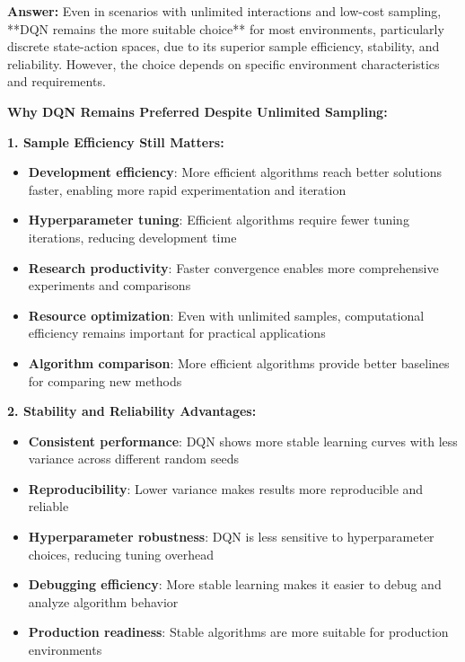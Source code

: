 \documentclass[12pt]{article}
\begin{document}
{{{\textbf{Answer:} Even in scenarios with unlimited interactions and low-cost sampling, **DQN remains the more suitable choice** for most environments, particularly discrete state-action spaces, due to its superior sample efficiency, stability, and reliability. However, the choice depends on specific environment characteristics and requirements.

\textbf{Why DQN Remains Preferred Despite Unlimited Sampling:}

\textbf{1. Sample Efficiency Still Matters:}
\begin{itemize}
    \item \textbf{Development efficiency}: More efficient algorithms reach better solutions faster, enabling more rapid experimentation and iteration
    \item \textbf{Hyperparameter tuning}: Efficient algorithms require fewer tuning iterations, reducing development time
    \item \textbf{Research productivity}: Faster convergence enables more comprehensive experiments and comparisons
    \item \textbf{Resource optimization}: Even with unlimited samples, computational efficiency remains important for practical applications
    \item \textbf{Algorithm comparison}: More efficient algorithms provide better baselines for comparing new methods
\end{itemize}

\textbf{2. Stability and Reliability Advantages:}
\begin{itemize}
    \item \textbf{Consistent performance}: DQN shows more stable learning curves with less variance across different random seeds
    \item \textbf{Reproducibility}: Lower variance makes results more reproducible and reliable
    \item \textbf{Hyperparameter robustness}: DQN is less sensitive to hyperparameter choices, reducing tuning overhead
    \item \textbf{Debugging efficiency}: More stable learning makes it easier to debug and analyze algorithm behavior
    \item \textbf{Production readiness}: Stable algorithms are more suitable for production environments
\end{itemize}

}}}
\end{document}

